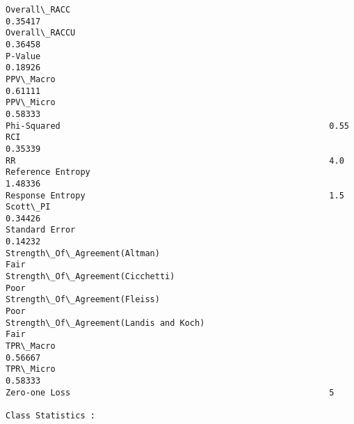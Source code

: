 \documentclass[11pt]{article}
\begin{document}
\begin{Verbatim}[commandchars=\\\{\}]
Overall\_RACC                                                     0.35417
Overall\_RACCU                                                    0.36458
P-Value                                                          0.18926
PPV\_Macro                                                        0.61111
PPV\_Micro                                                        0.58333
Phi-Squared                                                      0.55
RCI                                                              0.35339
RR                                                               4.0
Reference Entropy                                                1.48336
Response Entropy                                                 1.5
Scott\_PI                                                         0.34426
Standard Error                                                   0.14232
Strength\_Of\_Agreement(Altman)                                    Fair
Strength\_Of\_Agreement(Cicchetti)                                 Poor
Strength\_Of\_Agreement(Fleiss)                                    Poor
Strength\_Of\_Agreement(Landis and Koch)                           Fair
TPR\_Macro                                                        0.56667
TPR\_Micro                                                        0.58333
Zero-one Loss                                                    5

Class Statistics :


\end{Verbatim}
\end{document}
